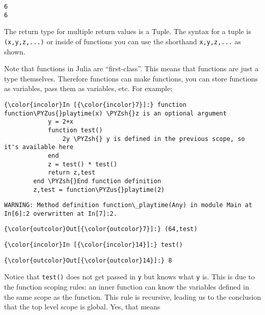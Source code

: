 \documentclass[11pt]{article}
\def\PYZus{\char`\_}
\def\PYZsh{\char`\#}
\begin{document}
    \begin{Verbatim}[commandchars=\\\{\}]
6
6

    \end{Verbatim}

    The return type for multiple return values is a Tuple. The syntax for a
tuple is \texttt{(x,y,z,...)} or inside of functions you can use the
shorthand \texttt{x,y,z,...} as shown.

Note that functions in Julia are ``first-class''. This means that
functions are just a type themselves. Therefore functions can make
functions, you can store functions as variables, pass them as variables,
etc. For example:

    \begin{Verbatim}[commandchars=\\\{\}]
{\color{incolor}In [{\color{incolor}7}]:} function function\PYZus{}playtime(x) \PYZsh{}z is an optional argument
            y = 2+x
            function test()
                2y \PYZsh{} y is defined in the previous scope, so it's available here
            end
            z = test() * test()
            return z,test
        end \PYZsh{}End function definition
        z,test = function\PYZus{}playtime(2)
\end{Verbatim}

    \begin{Verbatim}[commandchars=\\\{\}]
WARNING: Method definition function\_playtime(Any) in module Main at In[6]:2 overwritten at In[7]:2.

    \end{Verbatim}

            \begin{Verbatim}[commandchars=\\\{\}]
{\color{outcolor}Out[{\color{outcolor}7}]:} (64,test)
\end{Verbatim}
        
    \begin{Verbatim}[commandchars=\\\{\}]
{\color{incolor}In [{\color{incolor}14}]:} test()
\end{Verbatim}

            \begin{Verbatim}[commandchars=\\\{\}]
{\color{outcolor}Out[{\color{outcolor}14}]:} 8
\end{Verbatim}
        
    Notice that \texttt{test()} does not get passed in \texttt{y} but knows
what \texttt{y} is. This is due to the function scoping rules: an inner
function can know the variables defined in the same scope as the
function. This rule is recursive, leading us to the conclusion that the
top level scope is global. Yes, that means
\end{document}
